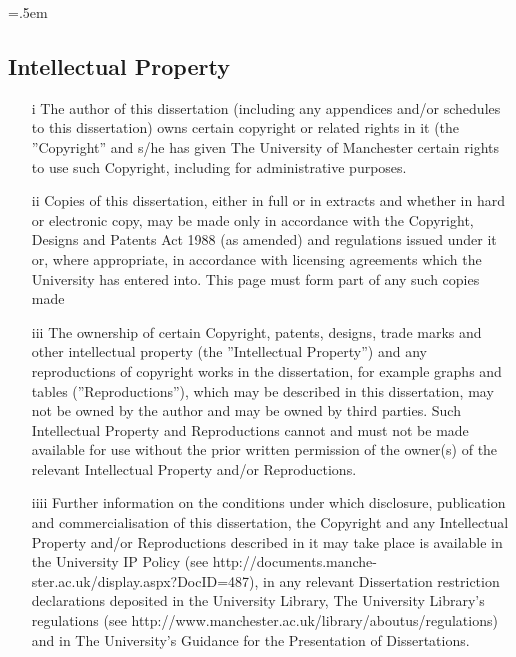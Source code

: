 \begingroup\emergencystretch=.5em
\begin{singlespace}

\let\clearpage\relax
\let\cleardoublepage\relax
\let\cleardoublepage\relax

\chapter*{Intellectual Property}
\begin{enumerate}
	\item[i] The author of this dissertation (including any appendices and/or schedules to this dissertation) owns certain copyright or related rights in it (the ''Copyright'' and s/he has given The University of Manchester certain rights to use such Copyright, including for administrative purposes.
	\item[ii]Copies of this dissertation, either in full or in extracts and whether in hard or electronic copy, may be made only in accordance with the Copyright, Designs and Patents Act 1988 (as amended) and regulations issued under it or, where appropriate, in accordance with licensing agreements which the University has entered into. This page must form part of any such copies made
	\item[iii]The ownership of certain Copyright, patents, designs, trade marks and other intellectual property (the ''Intellectual Property'') and any reproductions of copyright works in the dissertation, for example graphs and tables (''Reproductions''), which may be described in this dissertation, may not be owned by the author and may be owned by third parties. Such Intellectual Property and Reproductions cannot and must not be made available for use without the prior written permission of the owner(s) of the relevant Intellectual Property and/or Reproductions.
	\item[iiii]Further information on the conditions under which disclosure, publication and commercialisation of this dissertation, the Copyright and any Intellectual Property and/or Reproductions described in it may take place is available in the University IP Policy (see http://documents.manche-ster.ac.uk/display.aspx?DocID=487), in any relevant Dissertation restriction declarations deposited in the University Library, The University Library's regulations (see http://www.manchester.ac.uk/library/aboutus/regulations) and in The University's Guidance for the Presentation of Dissertations.
\end{enumerate}
\end{singlespace}
\vfill

\endgroup			
